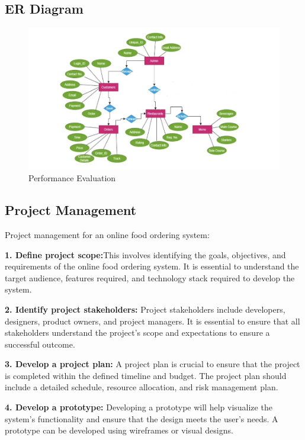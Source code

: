 \subsection{ER Diagram}{

\begin{figure}[h]
    \centering
    \includegraphics[scale=0.55]{ear.png}
    \caption{Performance Evaluation}
    \label{fig:pereva}
\end{figure}

\subsection{Project Management}
Project management for an online food ordering system:

\textbf{1. Define project scope:}This involves identifying the goals, objectives, and requirements of the online food ordering system. It is essential to understand the target audience, features required, and technology stack required to develop the system.

\textbf{2. Identify project stakeholders:} Project stakeholders include developers, designers, product owners, and project managers. It is essential to ensure that all stakeholders understand the project's scope and expectations to ensure a successful outcome.

\textbf{3. Develop a project plan:} A project plan is crucial to ensure that the project is completed within the defined timeline and budget. The project plan should include a detailed schedule, resource allocation, and risk management plan.

\textbf{4. Develop a prototype:} Developing a prototype will help visualize the system's functionality and ensure that the design meets the user's needs. A prototype can be developed using wireframes or visual designs.

}
